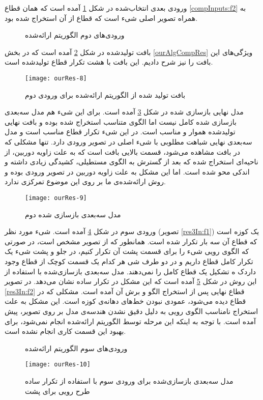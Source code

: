 ورودی بعدی انتخاب‌شده در شکل \ref{res2In} آمده است که همان قطاع \ref{compInputs:f2} به همراه تصویر اصلی شیء است که قطاع از آن استخراج شده بود.
\begin{figure}[h!]
	\centering
	\qquad
	\caption{ورودی‌های دوم الگوریتم ارائه‌شده}
	\label{res2In}
\end{figure}
\newline
بافت تولید‌شده در شکل \ref{res2Out} آمده است که در بخش \ref{ourAlgCompRes} ویژگی‌های این بافت را نیز شرح دادیم. این بافت با هشت تکرار قطاع تولید‌شده است.
\begin{figure}[h!]
	\centering
	\texttt{[image: ourRes-8]}
	\caption{بافت تولید شده از الگوریتم ارائه‌شده برای ورودی دوم}
	\label{res2Out}
\end{figure}

مدل نهایی بازسازی شده در شکل \ref{res2_3DOut} آمده است. برای این شیء هم مدل سه‌بعدی بازسازی شده کامل نیست اما الگوی متناسب استخراج شده بوده و بافت نهایی تولید‌شده هموار و مناسب است. در این شیء تکرار قطاع مناسب است و مدل سه‌بعدی نهایی شباهت مطلوبی با شیء اصلی در تصویر ورودی دارد. تنها مشکلی که در بافت مشاهده می‌شود، قسمت بالایی بافت است که به علت زاویه دوربین، از ناحیه‌ای استخراج شده که بعد از گسترش به الگوی مستطیلی، کشیدگی زیادی داشته و اندکی محو شده است. اما این مشکل به علت زاویه دوربین در تصویر ورودی بوده و روش ارائه‌شده‌ی ما بر روی این موضوع تمرکزی ندارد.
\begin{figure}[h!]
	\centering
	\texttt{[image: ourRes-9]}
	\caption{مدل سه‌بعدی بازسازی شده دوم}
	\label{res2_3DOut}
\end{figure}

ورودی سوم در شکل \ref{res3In} آمده است. شیء مورد نظر (تصویر \ref{res3In:f1}) یک کوزه است که قطاع آن سه بار تکرار شده است. همانطور که از تصویر مشخص است، در صورتی که الگوی رویی شیء را برای قسمت پشت آن تکرار کنیم، در جلو و پشت شیء یک تکرار کامل قطاع داریم و در دو طرف شی هر کدام یک قسمت کوچک از قطاع وجود داردک ه تشکیل یک قطاع کامل را نمی‌دهند. مدل سه‌بعدی بازسازی‌شده با استفاده از این روش در شکل \ref{res3_bad} آمده است که این مشکل در تکرار ساده نشان می‌دهد. در تصویر \ref{res3In:f2} قطاع نهایی پس از استخراج الگو و برش آن آمده است. مشکلی که در قطاع دیده می‌شود، عمودی نبودن خط‌های دهانه‌ی کوزه است. این مشکل به علت استخراج نامناسب الگوی رویی  به دلیل دقیق نشدن هندسه‌ی مدل بر روی تصویر، پیش آمده است. با توجه به اینکه این مرحله توسط الگوریتم ارائه‌شده انجام نمی‌شود، برای بهبود این قسمت کاری انجام نشده است.
\begin{figure}[h!]
	\centering
	\qquad
	\caption{ورودی‌های سوم الگوریتم ارائه‌شده}
	\label{res3In}
\end{figure}
\begin{figure}[h!]
	\centering
	\texttt{[image: ourRes-10]}
	\caption{مدل سه‌بعدی بازسازی‌شده برای ورودی سوم با استفاده از تکرار ساده طرح رویی برای پشت}
	\label{res3_bad}
\end{figure}

